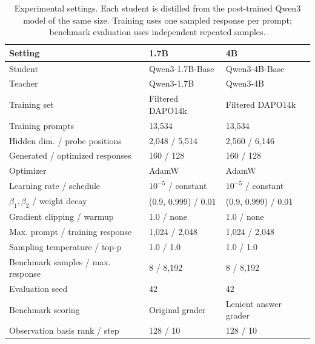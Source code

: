 \begin{table}[!htbp]
\centering
\caption{Experimental settings. Each student is distilled from the post-trained Qwen3 model of the same size. Training uses one sampled response per prompt; benchmark evaluation uses independent repeated samples.}
\label{tab:settings}
\small
\setlength{\tabcolsep}{3pt}
\begin{tabular}{lll}
\toprule
Setting & 1.7B & 4B \\
\midrule
Student & Qwen3-1.7B-Base & Qwen3-4B-Base \\
Teacher & Qwen3-1.7B & Qwen3-4B \\
Training set & Filtered DAPO14k & Filtered DAPO14k \\
Training prompts & 13,534 & 13,534 \\
Hidden dim. / probe positions & 2,048 / 5,514 & 2,560 / 6,146 \\
Generated / optimized responses & 160 / 128 & 160 / 128 \\
Optimizer & AdamW & AdamW \\
Learning rate / schedule & $10^{-5}$ / constant & $10^{-5}$ / constant \\
$\beta_1,\beta_2$ / weight decay & (0.9, 0.999) / 0.01 & (0.9, 0.999) / 0.01 \\
Gradient clipping / warmup & 1.0 / none & 1.0 / none \\
Max. prompt / training response & 1,024 / 2,048 & 1,024 / 2,048 \\
Sampling temperature / top-p & 1.0 / 1.0 & 1.0 / 1.0 \\
Benchmark samples / max. response & 8 / 8,192 & 8 / 8,192 \\
Evaluation seed & 42 & 42 \\
Benchmark scoring & Original grader & Lenient answer grader \\
Observation basis rank / step & 128 / 10 & 128 / 10 \\
\bottomrule
\end{tabular}
\end{table}
